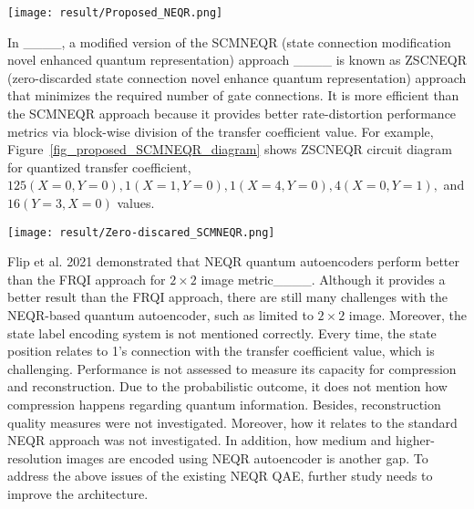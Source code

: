 \begin{figure*}[htbp]
\centerline{\texttt{[image: result/Proposed\_NEQR.png]}}
\caption{A NZ-NEQR circuit for pixel values representation where an initial connection (marked as red) and zero-discarded zone (marked as orange). Zero is discarded because the identity gate has no control over the c-not gate.}
\label{fig_nzneqr_diagram}
\end{figure*}
In ____, a modified version of the SCMNEQR (state connection modification novel enhanced quantum representation) approach  ____ is known as ZSCNEQR (zero-discarded state connection novel enhance quantum representation) approach that minimizes the required number of gate connections. It is more efficient than the SCMNEQR approach because it provides better rate-distortion performance metrics via block-wise division of the transfer coefficient value. For example, Figure~\ref{fig_proposed_SCMNEQR_diagram} shows ZSCNEQR circuit diagram for quantized transfer coefficient,  $125(X=0, Y=0), 1(X=1, Y=0), 1(X=4, Y=0), 4(X=0, Y=1),$ and $16(Y=3, X=0)$ values.

\begin{figure*}[!t]
\centerline{\texttt{[image: result/Zero-discared\_SCMNEQR.png]}}
\caption{Quantized transform coefficient representation based on ZSCNEQR circuit. It includes an initial connection (marked in red) and a zero-discarded zone (marked in green)}
\label{fig_proposed_SCMNEQR_diagram}
\end{figure*}

Flip et al. 2021 demonstrated that NEQR quantum autoencoders perform better than the FRQI approach for $2\times2$ image metric____. Although it provides a better result than the FRQI approach, there are still many challenges with the NEQR-based quantum autoencoder, such as limited to $2\times2$ image. Moreover, the state label encoding system is not mentioned correctly. Every time, the state position relates to 1's connection with the transfer coefficient value, which is challenging. Performance is not assessed to measure its capacity for compression and reconstruction. Due to the probabilistic outcome, it does not mention how compression happens regarding quantum information. Besides, reconstruction quality measures were not investigated. Moreover, how it relates to the standard NEQR approach was not investigated. In addition, how medium and higher-resolution images are encoded using NEQR autoencoder is another gap. To address the above issues of the existing NEQR QAE, further study needs to improve the architecture.